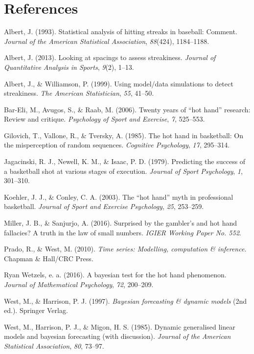 \documentclass[12pt,twoside]{dukestatscithesis}
\theoremstyle{definition}
\theoremstyle{definition}
\theoremstyle{definition}
\theoremstyle{remark}
\begin{document}
\chapter*{References}\label{references}


\noindent

\setlength{\parindent}{-0.20in} \setlength{\leftskip}{0.20in}
\setlength{\parskip}{8pt}

\hypertarget{refs}{}
\hypertarget{ref-albert93}{}
Albert, J. (1993). Statistical analysis of hitting streaks in baseball:
Comment. \emph{Journal of the American Statistical Association},
\emph{88}(424), 1184--1188.

\hypertarget{ref-albert13}{}
Albert, J. (2013). Looking at spacings to assess streakiness.
\emph{Journal of Quantitative Analysis in Sports}, \emph{9}(2), 1--13.

\hypertarget{ref-albert99}{}
Albert, J., \& Williamson, P. (1999). Using model/data simulations to
detect streakiness. \emph{The American Statistician}, \emph{55}, 41--50.

\hypertarget{ref-bareli06}{}
Bar-Eli, M., Avugos, S., \& Raab, M. (2006). Twenty years of ``hot
hand'' research: Review and critique. \emph{Psychology of Sport and
Exercise}, \emph{7}, 525--553.

\hypertarget{ref-gilovich85}{}
Gilovich, T., Vallone, R., \& Tversky, A. (1985). The hot hand in
basketball: On the misperception of random sequences. \emph{Cognitive
Psychology}, \emph{17}, 295--314.

\hypertarget{ref-jagacinski79}{}
Jagacinski, R. J., Newell, K. M., \& Isaac, P. D. (1979). Predicting the
success of a basketball shot at various stages of execution.
\emph{Journal of Sport Psychology}, \emph{1}, 301--310.

\hypertarget{ref-koehler03}{}
Koehler, J. J., \& Conley, C. A. (2003). The ``hot hand'' myth in
professional basketball. \emph{Journal of Sport and Exercise
Psychology}, \emph{25}, 253--259.

\hypertarget{ref-miller16}{}
Miller, J. B., \& Sanjurjo, A. (2016). Surprised by the gambler's and
hot hand fallacies? A truth in the law of small numbers. \emph{IGIER
Working Paper No. 552}.

\hypertarget{ref-west10}{}
Prado, R., \& West, M. (2010). \emph{Time series: Modelling, computation
\& inference}. Chapman \& Hall/CRC Press.

\hypertarget{ref-wetzels16}{}
Ryan Wetzels, e. a. (2016). A bayesian test for the hot hand phenomenon.
\emph{Journal of Mathematical Psychology}, \emph{72}, 200--209.

\hypertarget{ref-west97}{}
West, M., \& Harrison, P. J. (1997). \emph{Bayesian forecasting \&
dynamic models} (2nd ed.). Springer Verlag.

\hypertarget{ref-west85}{}
West, M., Harrison, P. J., \& Migon, H. S. (1985). Dynamic generalised
linear models and bayesian forecasting (with discussion). \emph{Journal
of the American Statistical Association}, \emph{80}, 73--97.


\end{document}
